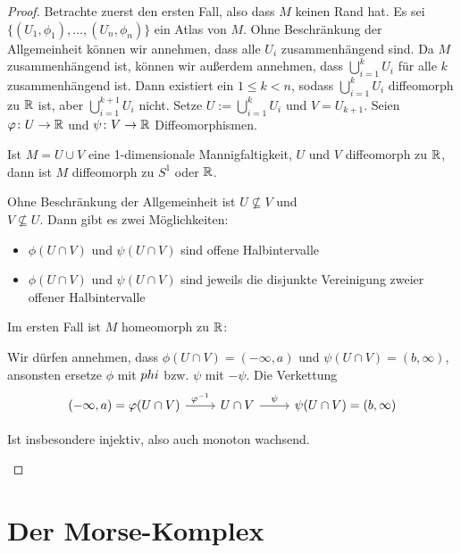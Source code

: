 \begin{proof}
    Betrachte zuerst den ersten Fall, also dass $M$ keinen Rand hat. Es sei 
    $\{ (U_1, \phi_1), \dots, (U_n, \phi_n) \}$ ein Atlas von $M$. Ohne Beschränkung der 
    Allgemeinheit können wir annehmen, dass alle $U_i$ zusammenhängend sind. 
    Da $M$ zusammenhängend ist, können wir außerdem annehmen, dass 
    $\bigcup_{i = 1}^k U_i$ für alle $k$ zusammenhängend ist. Dann existiert ein $1 \leq k < n$, 
    sodass $\bigcup_{i = 1}^k U_i$ diffeomorph zu ${ \mathbb R }$ ist, aber $\bigcup_{i = 1}^{k + 1} U_i$ 
    nicht. Setze $U := \bigcup_{i = 1}^k U_i$ und $V = U_{k + 1}$. Seien $\varphi \colon U \to { \mathbb R }$
    und $\psi \colon V \to { \mathbb R }$ Diffeomorphismen. 
    \begin{claim*}
        Ist $M = U \cup V$ eine 1-dimensionale Mannigfaltigkeit, $U$ und $V$ diffeomorph zu 
        ${ \mathbb R }$, dann ist $M$ diffeomorph zu $S^1$ oder ${ \mathbb R }$.
    \end{claim*}

    \begin{smallproof}
        Ohne Beschränkung der Allgemeinheit ist $U \not\subseteq V$ und \\ 
        $V \not\subseteq U$. Dann gibt es zwei Möglichkeiten:
        \begin{itemize}
            \item $\phi(U \cap V)$ und $\psi(U \cap V)$ sind offene Halbintervalle
            \item $\phi(U \cap V)$ und $\psi(U \cap V)$ sind jeweils die disjunkte Vereinigung
                zweier offener Halbintervalle
        \end{itemize}
        Im ersten Fall ist $M$ homeomorph zu ${ \mathbb R }$:

        Wir dürfen annehmen, dass $\phi(U \cap V) = (- \infty, a)$ und $\psi(U \cap V) = (b, \infty)$,
        ansonsten ersetze $\phi$ mit $\-phi$ bzw. $\psi$ mit $-\psi$. Die Verkettung
        \[ \begin{tikzcd}
            (- \infty, a) = \phi(U \cap V) \arrow[r, "\phi^{-1}"] & 
                U \cap V \arrow[r, "\psi"] & 
                \psi(U \cap V) = (b, \infty)
        \end{tikzcd} \] 
        
        Ist insbesondere injektiv, also auch monoton wachsend. 
        \todo{}
    \end{smallproof}
\end{proof}

\section{Der Morse-Komplex}
